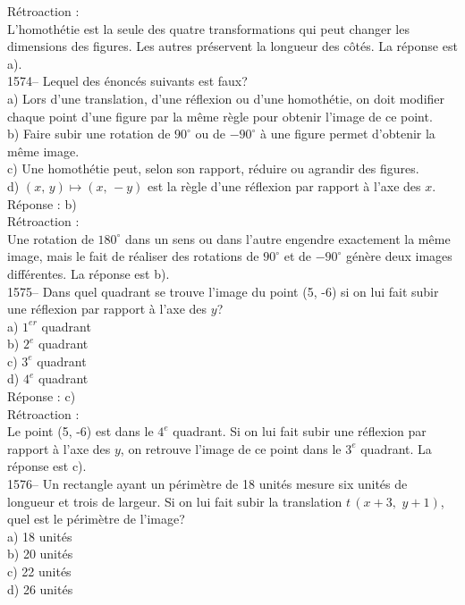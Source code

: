 R\'etroaction :\\
L'homoth\'etie est la seule des quatre transformations qui peut
changer les
dimensions des figures. Les autres pr\'eservent la longueur des c\^ot\'es.
La r\'eponse est a).\\

1574-- Lequel des \'enonc\'es suivants est faux?\\
a)  Lors d'une translation, d'une r\'eflexion ou d'une homoth\'etie, on doit
modifier chaque point d'une figure par la m\^eme r\`egle pour obtenir
l'image de ce point.\\
b) Faire subir une rotation de $90^{\circ}$ ou de $-90^{\circ}$ \`a
une figure permet d'obtenir la m\^eme image.\\
c) Une homoth\'etie peut, selon son rapport, r\'eduire ou agrandir
des figures.\\
d) $(x,\,y)\mapsto(x,\,-y)$ est la r\`egle d'une r\'eflexion par
rapport \`a
l'axe des $x$.\\

R\'eponse : b)\\

R\'etroaction :\\
Une rotation de $180^{\circ}$ dans un sens ou dans l'autre engendre
exactement la m\^eme image, mais le fait de r\'ealiser des rotations
de $90^\circ$ et de
$-90^\circ$ g\'en\`ere deux images diff\'erentes. La r\'eponse est b).\\

1575-- Dans quel quadrant se trouve l'image du point (5, -6) si on
lui fait subir une r\'eflexion
par rapport \`a l'axe des $y$?\\
a) $1^{er}$ quadrant\\
b) $2^e$ quadrant\\
c) $3^e$ quadrant\\
d) $4^e$ quadrant\\

R\'eponse : c)\\

R\'etroaction :\\
Le point (5, -6) est dans le $4^e$ quadrant. Si on lui fait subir
une r\'eflexion par rapport \`a l'axe des $y$, on retrouve l'image
de ce point dans le $3^e$ quadrant. La r\'eponse est c).\\

1576-- Un rectangle ayant un p\'erim\`etre de 18 unit\'es mesure six
unit\'es de longueur et trois de largeur. Si on lui fait subir la
translation $t$$\,(x+3,\,\,y+1)$, quel est le p\'erim\`etre de l'image?\\
a) 18 unit\'es\\
b) 20 unit\'es\\
c) 22 unit\'es\\
d) 26 unit\'es\\

